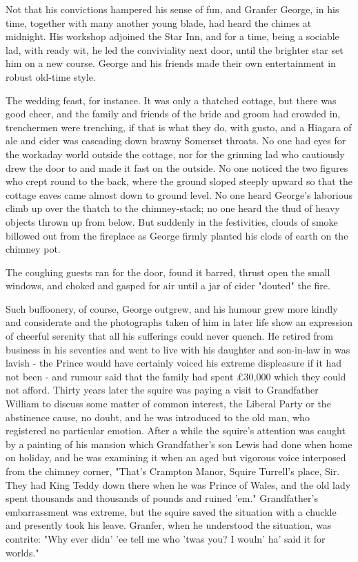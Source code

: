 Not that his convictions hampered his sense of fun, and Granfer George, in his time, together with many another young blade, had heard the chimes at midnight. His workshop adjoined the Star Inn, and for a time, being a sociable lad, with ready wit, he led the conviviality next door, until the brighter star set him on a new course. George and his friends made their own entertainment in robust old-time style.

The wedding feast, for instance. It was only a thatched cottage, but there was good cheer, and the family and friends of the bride and groom had crowded in, trenchermen were trenching, if that is what they do, with gusto, and a Hiagara of ale and cider was cascading down brawny Somerset throats. No one had eyes for the workaday world outside the cottage, nor for the grinning lad who cautiously drew the door to and made it fast on the outside. No one noticed the two figures who crept round to the back, where the ground sloped steeply upward so that the cottage eaves came almost down to ground level. No one heard George's laborious climb up over the thatch to the chimney-stack; no one heard the thud of heavy objects thrown up from below. But suddenly in the festivities, clouds of smoke billowed out from the fireplace as George firmly planted his clods of earth on the chimney pot.

The coughing guests ran for the door, found it barred, thrust open the small windows, and choked and gasped for air until a jar of cider "douted" the fire.

Such buffoonery, of course, George outgrew, and his humour grew more kindly and considerate and the photographs taken of him in later life show an expression of cheerful serenity that all his sufferings could never quench. He retired from business in his seventies and went to live with his daughter and son-in-law in was lavish - the Prince would have certainly voiced his extreme displeasure if it had not been - and rumour said that the family had spent £30,000 which they could not afford. Thirty years later the squire was paying a visit to Grandfather William to discuss some matter of common interest, the Liberal Party or the abstinence cause, no doubt, and he was introduced to the old man, who registered no particular emotion. After a while the squire's attention was caught by a painting of his mansion which Grandfather's son Lewis had done when home on holiday, and he was examining it when an aged but vigorous voice interposed from the chimney corner, "That's Crampton Manor, Squire Turrell's place, Sir. They had King Teddy down there when he was Prince of Wales, and the old lady spent thousands and thousands of pounds and ruined 'em." Grandfather's embarrassment was extreme, but the squire saved the situation with a chuckle and presently took his leave. Granfer, when he understood the situation, was contrite: "Why ever didn' 'ee tell me who 'twas you? I wouln' ha' said it for worlds."
 
